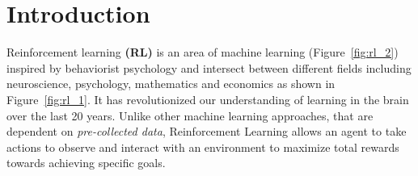 
\chapter{Introduction}\label{chapter:introduction}

Reinforcement learning \textbf{(RL)} is an area of machine learning (Figure~\ref{fig:rl_2}) inspired by behaviorist psychology and intersect between different fields including neuroscience, psychology, mathematics and economics as shown in Figure~\ref{fig:rl_1}. It has revolutionized our understanding of learning in the brain over the last 20 years. Unlike other machine learning approaches, that are dependent on \textit{pre-collected data}, Reinforcement Learning allows an agent to take actions to observe and interact with an environment to maximize total rewards towards achieving specific goals.

